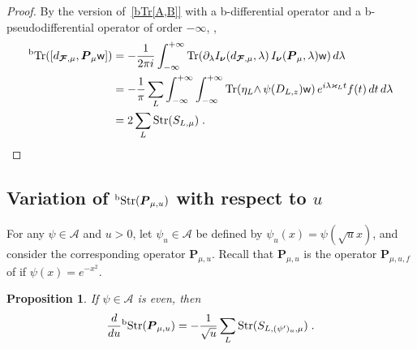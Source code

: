 \documentclass{memo-l}
\theoremstyle{plain}
\newtheorem{prop}[thm]{Proposition}
\theoremstyle{definition}
\theoremstyle{remark}
\renewcommand{\AA}{\mathcal{A}}
\newcommand{\FF}{\mathcal{F}}
\newcommand{\bfP}{\boldsymbol{P}}
\newcommand{\bfFF}{\boldsymbol{\FF}}
\newcommand{\bfnu}{\boldsymbol{\nu}}
\newcommand{\sw}{\mathsf{w}}
\newcommand{\Tr}{\operatorname{Tr}}
\newcommand{\bTr}{{}^{\text{\rm b}}\!\Tr}
\newcommand{\Str}{\operatorname{Str}}
\newcommand{\bStr}{{}^{\text{\rm b}}\!\Str}
\numberwithin{section}{chapter}
\numberwithin{equation}{section}%
\begin{document}
\begin{proof}
By the version of~\eqref{bTr[A,B]} with a b-differential operator and a b-pseudodifferential operator of order $-\infty$, ,
\begin{align*}
\bTr([d_{\bfFF,\mu},\bfP_\mu\sw])
&=-\frac{1}{2\pi i}\int_{-\infty}^{+\infty}\Tr(\partial_\lambda I_{\bfnu}(d_{\bfFF,\mu},\lambda)\, I_{\bfnu}(\bfP_\mu,\lambda)\sw)\,d\lambda\\
&=-\frac{1}{\pi}\sum_L\int_{-\infty}^{+\infty}\int_{-\infty}^{+\infty}\Tr({\eta_L\wedge}\,\psi(D_{L,z})\sw)\,e^{i\lambda\varkappa_Lt}f(t)\,dt\,d\lambda\\
&=2\sum_L\Str(S_{L,\mu})\;.\qedhere
\end{align*}
\end{proof}


\subsection{Variation of $\bStr(\bfP_{\mu,u})$ with respect to $u$}\label{ss: variation of bTrs(P_mu u)}

For any $\psi\in\AA$ and $u>0$, let $\psi_u\in\AA$ be defined by $\psi_u(x)=\psi(\sqrt ux)$, and consider the corresponding operator $\bfP_{\mu,u}$. Recall that $\bfP_{\mu,u}$ is the operator $\bfP_{\mu,u,f}$ of  if $\psi(x)=e^{-x^2}$.

\begin{prop}\label{p: d/du bTrs(P_mu u)}
If $\psi\in\AA$ is even, then
\[
\frac{d}{du}\bStr(\bfP_{\mu,u})=-\frac1{\sqrt u}\sum_L\Str(S_{L,(\psi')_u,\mu})\;.
\]
\end{prop}
\end{document}
